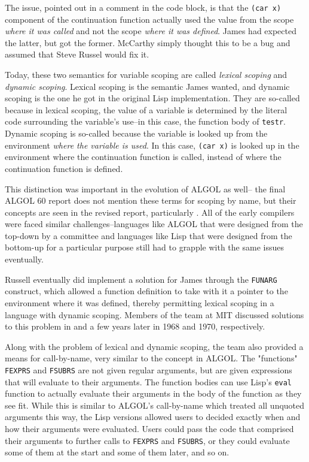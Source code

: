 The issue, pointed out in a comment in the code block, is that the \texttt{(car x)}
component of the continuation function actually used the value from the scope
\textit{where it was called} and not the scope \textit{where it was defined}.
James had expected the latter, but got the former.
McCarthy simply thought this to be a bug and assumed that Steve Russel would fix it.

Today, these two semantics for variable scoping are called \textit{lexical scoping}
and \textit{dynamic scoping}.
Lexical scoping is the semantic James wanted, and dynamic scoping is the one he got
in the original Lisp implementation.
They are so-called because in lexical scoping, the value of a variable is determined
by the literal code surrounding the variable's use--in this case, the function body
of \texttt{testr}.
Dynamic scoping is so-called because the variable is looked up from the environment
\textit{where the variable is used}. In this case, \texttt{(car x)} is looked up in the
environment where the continuation function is called, instead of where the continuation
function is defined.

This distinction was important in the evolution of ALGOL as well--
the final ALGOL 60 report does not mention these terms for scoping by name,
but their concepts are seen in the revised report, particularly
\cite[Section 4.7.3.3. Body replacement and execution]{revised_report_on_the_algorithmic_language_algol_68_1976}.
All of the early compilers were faced similar challenges--languages like ALGOL
that were designed from the top-down by a committee and languages like Lisp
that were designed from the bottom-up for a particular purpose still had to
grapple with the same issues eventually.

Russell eventually did implement a solution for James through the \texttt{FUNARG}
construct, which allowed a function definition to take with it a pointer to the
environment where it was defined, thereby permitting lexical scoping in a language
with dynamic scoping.
Members of the team at MIT discussed solutions to this problem in
and
a few years later in 1968 and 1970, respectively.

Along with the problem of lexical and dynamic scoping, the team also provided a means for
\gls{call-by-name}, very similar to the concept in ALGOL.
The "functions" \texttt{FEXPRS} and \texttt{FSUBRS} are not given regular arguments, but are given expressions
that will evaluate to their arguments.
The function bodies can use Lisp's \texttt{eval} function to actually evaluate their arguments in the body of the
function as they see fit.
While this is similar to ALGOL's \gls{call-by-name} which treated all unquoted arguments this way,
the Lisp versions allowed users to decided exactly when and how their arguments were evaluated.
Users could pass the code that comprised their arguments to further calls to
\texttt{FEXPRS} and \texttt{FSUBRS}, or they could evaluate some of them at the start
and some of them later, and so on.

